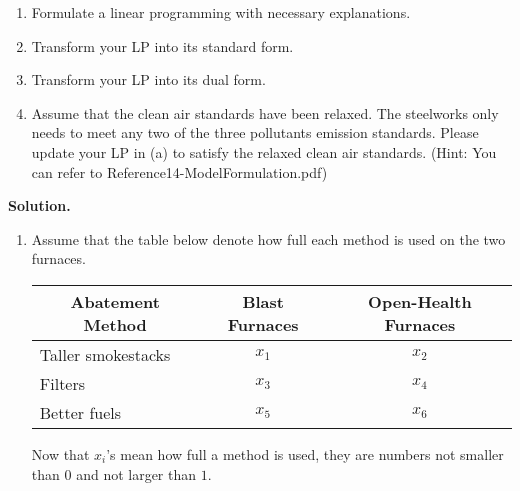 \documentclass[12pt,a4paper]{article}
\theoremstyle{definition}
\begin{document}
\begin{enumerate}
\begin{table}[h]
    \end{table}
     
    
    \begin{enumerate}
    	\item Formulate a linear programming with necessary explanations.
    	\item
    	Transform your LP into its standard form.
    	\item
    	Transform your LP into its dual form.
    	\item 
    	Assume that the clean air standards have been relaxed. The steelworks only needs to meet any two of the three pollutants emission standards. Please update your LP in (a) to satisfy the relaxed clean air standards. {\color{blue}(Hint: You can refer to Reference14-ModelFormulation.pdf)}
    	
    \end{enumerate}
    \textbf{Solution.}\\
    \begin{enumerate}
    	\item 
    		Assume that the table below denote how full each method is used on the two furnaces.
    		 \begin{table}[h]
    			\centering
    			\footnotesize
    			\label{variableset}
    			\renewcommand\arraystretch{1.1}
    			\begin{tabular}{lclcl}
    				\hline
    				\multicolumn{1}{c}{\textbf{Abatement Method}} & \multicolumn{2}{c}{\textbf{Blast Furnaces}} & \multicolumn{2}{c}{\textbf{Open-Health Furnaces}} \\ \hline
    				Taller smokestacks                             & \multicolumn{2}{c}{$x_1$}                       & \multicolumn{2}{c}{$x_2$}                           \\
    				Filters                                        & \multicolumn{2}{c}{$x_3$}                       & \multicolumn{2}{c}{$x_4$}                            \\
    				Better fuels                                   & \multicolumn{2}{c}{$x_5$}                      & \multicolumn{2}{c}{$x_6$}                            \\ \hline
    			\end{tabular}
    		\end{table}
    	    
    	    Now that $x_i$'s mean how full a method is used, they are numbers not smaller than $0$ and not larger than $1$.
    	    

\end{enumerate}
\end{enumerate}
\end{document}
